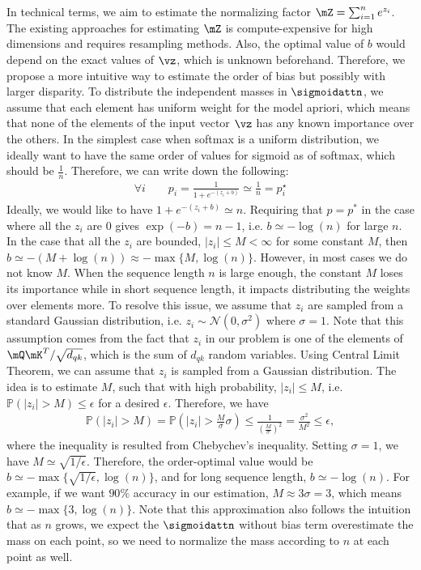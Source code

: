 In technical terms, we aim to estimate the normalizing factor $\mZ = \sum_{i = 1}^n e^{z_i}$. The existing approaches for estimating $\mZ$ is compute-expensive for high dimensions and requires resampling methods.
Also, the optimal value of $b$ would depend on the exact values of $\vz$, which is unknown beforehand. Therefore, we propose a more intuitive way to estimate the order of bias but possibly with larger disparity.
To distribute the independent masses in $\sigmoidattn$, we assume that each element has uniform weight for the model apriori, which means that none of the elements of the input vector $\vz$ has any known importance over the others. In the simplest case when softmax is a uniform distribution, we ideally want to have the same order of values for sigmoid as of softmax, which should be $\frac{1}{n}$. Therefore, we can write down the following:
\begin{align}
    \forall i \qquad p_i = \frac{1}{1 + e^{-(z_i + b)}} \simeq \frac{1}{n} = p_i^\star
\end{align}
Ideally, we would like to have $1 + e^{-(z_i + b)} \simeq n$. Requiring that $p=p^*$ in the case where all the $z_i$ are $0$ gives $\exp(-b) = n - 1$, i.e. $b \simeq -\log(n)$ for large $n$. In the case that all the $z_i$ are bounded, $|z_i| \leq M < \infty$ for some constant $M$, then $b \simeq -(M + \log(n)) \approx -\max\{M, \log(n)\}$. However, in most cases we do not know $M$. When the sequence length $n$ is large enough, the constant $M$ loses its importance while in short sequence length, it impacts distributing the weights over elements more. To resolve this issue, we assume that $z_i$ are sampled from a standard Gaussian distribution, i.e. $z_i \sim \mathcal{N}(0, \sigma^2)$ where $\sigma = 1$. Note that this assumption comes from the fact that $z_i$ in our problem is one of the elements of $\mQ\mK^T / \sqrt{d_{qk}}$, which is the sum of $d_{qk}$ random variables. Using Central Limit Theorem, we can assume that $z_i$ is sampled from a Gaussian distribution. The idea is to estimate $M$, such that with high probability, $|z_i| \leq M$, i.e. $\mathbb{P}\left(|z_i| > M\right) \leq \epsilon$ for a desired $\epsilon$. Therefore, we have
\begin{align}
    \mathbb{P}\left(|z_i| > M\right)  = \mathbb{P}\left(|z_i| > \frac{M}{\sigma}\sigma\right) \leq \frac{1}{(\frac{M}{\sigma})^2} = \frac{\sigma^2}{M^2} \leq \epsilon,
\end{align}
where the inequality is resulted from Chebychev's inequality. Setting $\sigma = 1$, we have $M \simeq \sqrt{1/\epsilon}$. Therefore, the order-optimal value would be $b \simeq -\max\{\sqrt{1/\epsilon}, \log(n)\}$, and for long sequence length, $b \simeq -\log(n)$. For example, if we want $90\%$ accuracy in our estimation, $M \approx 3\sigma = 3$, which means $b \simeq -\max\{3, \log(n)\}$.
Note that this approximation also follows the intuition that as $n$ grows, we expect the $\sigmoidattn$ without bias term overestimate the mass on each point, so we need to normalize the mass according to $n$ at each point as well. 


